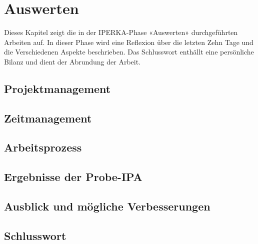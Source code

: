 \chapter{Auswerten}\label{ch:auswerten}
Dieses Kapitel zeigt die in der IPERKA-Phase «Auswerten» durchgeführten Arbeiten auf. In dieser Phase wird eine Reflexion über die letzten Zehn Tage und die Verschiedenen Aspekte beschrieben. Das Schlusswort enthällt eine persönliche Bilanz und dient der Abrundung der Arbeit.

\section{Projektmanagement}

\section{Zeitmanagement}
\section{Arbeitsprozess}
\section{Ergebnisse der Probe-IPA}
\section{Ausblick und mögliche Verbesserungen}
\section{Schlusswort}
\newpage